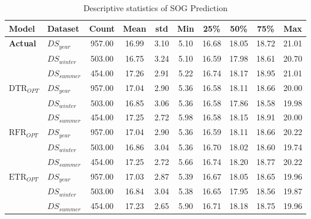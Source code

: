 \begin{table}[h]
    \footnotesize
    \centering
    {\begin{tabular}{ l l c c c c c c c c }
    \hline
    Model & Dataset & Count & Mean & std & Min & 25\% & 50\% & 75\% & Max \\
    \hline
    \textbf{{Actual}} & $DS_{year}$ & 957.00 &  16.99 &   3.10 & 5.10 &  16.68 &  18.05 &  18.72 &  21.01 \\
    & $DS_{winter}$ & 503.00 &  16.75 &   3.24 & 5.10 &  16.59 &  17.98 &  18.61 &  20.70 \\
    & $DS_{summer}$ & 454.00 &  17.26 &   2.91 & 5.22 &  16.74 &  18.17 &  18.95 &  21.01 \\
    $\text{DTR}_{OPT}$ & $DS_{year}$ & 957.00 &  17.04 &   2.90 & 5.36 &  16.58 &  18.11 &  18.66 &  20.00 \\
    & $DS_{winter}$ & 503.00 &  16.85 &   3.06 & 5.36 &  16.58 &  17.86 &  18.58 &  19.98 \\
    & $DS_{summer}$ & 454.00 &  17.25 &   2.72 & 5.98 &  16.58 &  18.15 &  18.91 &  20.00 \\
    $\text{RFR}_{OPT}$ & $DS_{year}$ & 957.00 &  17.04 &   2.90 & 5.36 &  16.59 &  18.11 &  18.66 &  20.22 \\
    & $DS_{winter}$ & 503.00 &  16.86 &   3.04 & 5.36 &  16.70 &  18.02 &  18.60 &  19.74 \\
    & $DS_{summer}$ & 454.00 &  17.25 &   2.72 & 5.66 &  16.74 &  18.20 &  18.77 &  20.22 \\
    $\text{ETR}_{OPT}$ & $DS_{year}$ & 957.00 &  17.03 &   2.87 & 5.39 &  16.67 &  18.05 &  18.65 &  19.96 \\
    & $DS_{winter}$ & 503.00 &  16.84 &   3.04 & 5.38 &  16.65 &  17.95 &  18.56 &  19.87 \\
    & $DS_{summer}$ & 454.00 &  17.23 &   2.65 & 5.90 &  16.71 &  18.18 &  18.75 &  19.96 \\
    \hline
    \end{tabular}}
\caption{Descriptive statistics of SOG Prediction}\label{tbl:SOG_pred_descriptive}
\end{table}



